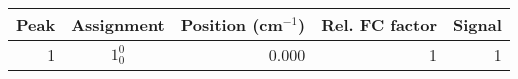 \documentclass[12pt]{article}
\begin{document}

\renewcommand{\baselinestretch}{1.5}
\begin{table}
\begin{tabular}{rcrrr}
Peak& Assignment&Position (cm$^{-1}$)& Rel. FC factor& Signal\\
\hline
1& $1^0_0$&0.000&1&1\\
\end{tabular}
\end{table}
\end{document}
